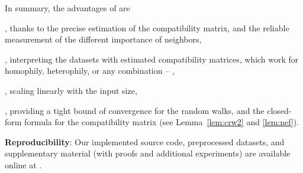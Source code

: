 In summary, the advantages of \method are
\ben
\item {\bf \Accurate}, thanks to the precise estimation of the compatibility matrix,
and the reliable measurement of the different importance of neighbors,
\item {\bf \explain}, interpreting the datasets with estimated compatibility matrices, which work for homophily, heterophily, or any combination -- \xophily,
\item {\bf \scale}, scaling linearly with the input size,
\item {\bf \theory}, providing a tight bound of convergence for the random walks, and the closed-form formula for the compatibility matrix (see Lemma~\ref{lem:crw2} and \ref{lem:nef}).
\een


{\bf Reproducibility}: Our implemented source code, preprocessed datasets, and supplementary material (with proofs and additional experiments) are available online at \urlcolor{\codeurl}.


